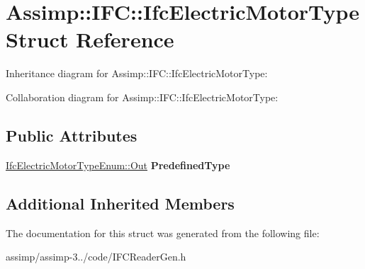 \hypertarget{struct_assimp_1_1_i_f_c_1_1_ifc_electric_motor_type}{\section{Assimp\+:\+:I\+F\+C\+:\+:Ifc\+Electric\+Motor\+Type Struct Reference}
\label{struct_assimp_1_1_i_f_c_1_1_ifc_electric_motor_type}
}


Inheritance diagram for Assimp\+:\+:I\+F\+C\+:\+:Ifc\+Electric\+Motor\+Type\+:


Collaboration diagram for Assimp\+:\+:I\+F\+C\+:\+:Ifc\+Electric\+Motor\+Type\+:
\subsection*{Public Attributes}
\begin{DoxyCompactItemize}
\item 
\hypertarget{struct_assimp_1_1_i_f_c_1_1_ifc_electric_motor_type_acb92685461b4bd4c69aa6148f464d43d}{\hyperlink{classboost_1_1shared__ptr}{Ifc\+Electric\+Motor\+Type\+Enum\+::\+Out} {\bfseries Predefined\+Type}}\label{struct_assimp_1_1_i_f_c_1_1_ifc_electric_motor_type_acb92685461b4bd4c69aa6148f464d43d}

\end{DoxyCompactItemize}
\subsection*{Additional Inherited Members}


The documentation for this struct was generated from the following file\+:\begin{DoxyCompactItemize}
\item 
assimp/assimp-\/3../code/I\+F\+C\+Reader\+Gen.\+h\end{DoxyCompactItemize}

